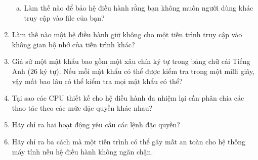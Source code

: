 \begin{multicols}{2}
\begin{enumerate}
\begin{enumerate}[a.]
    \item Làm thế nào để bảo hệ điều hành rằng bạn không muốn người
      dùng khác truy cập vào file của bạn?
    \end{enumerate}

  \item Làm thế nào một hệ điều hành giữ không cho một tiến trình truy
    cập vào không gian bộ nhớ của tiến trình khác?

  \item Giả sử một mật khẩu bao gồm một xâu chín ký tự trong bảng chữ
    cái Tiếng Anh ($26$ ký tự). Nếu mỗi mật khẩu có thể được kiểm tra
    trong một milli giây, vậy mất bao lâu có thể kiểm tra mọi mật khẩu
    có thể?

  \item Tại sao các CPU thiết kế cho hệ điều hành đa nhiệm lại cần
    phân chia các thao tác theo các mức đặc quyền khác nhau?

  \item Hãy chỉ ra hai hoạt động yêu cầu các lệnh đặc quyền?

  \item Hãy chỉ ra ba cách mà một tiến trình có thể gây mất an toàn
    cho hệ thống máy tính nếu hệ điều hành không ngăn chặn.
  \end{enumerate}
\end{multicols}


